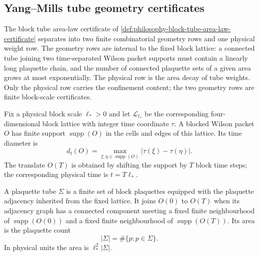 \subsection{Yang--Mills tube geometry certificates}
\label{subsec:philosophy-yang-mills-tube-geometry-certificates}

The block tube area-law certificate of
\autoref{def:philosophy-block-tube-area-law-certificate} separates into
two finite combinatorial geometry rows and one physical weight row. The
geometry rows are internal to the fixed block lattice: a connected tube
joining two time-separated Wilson packet supports must contain a
linearly long plaquette chain, and the number of connected plaquette
sets of a given area grows at most exponentially. The physical row is
the area decay of tube weights. Only the physical row carries the
confinement content; the two geometry rows are finite block-scale
certificates.

\begin{definition}
\label{def:philosophy-blocked-wilson-support}
Fix a physical block scale $\ell_{\ast}>0$ and let
$\mathcal L_{\ell_{\ast}}$ be the corresponding four-dimensional block
lattice with integer time coordinate $\tau$. A blocked Wilson packet
$O$ has finite support $\operatorname{supp}(O)$ in the cells and edges
of this lattice. Its time diameter is
$$
d_t(O)=
\max_{\xi,\eta\in\operatorname{supp}(O)}
|\tau(\xi)-\tau(\eta)|.
$$
The translate $O(T)$ is obtained by shifting the support by $T$ block
time steps; the corresponding physical time is $t=T\ell_{\ast}$.
\end{definition}

\begin{definition}
\label{def:philosophy-plaquette-tube}
A plaquette tube $\Sigma$ is a finite set of block plaquettes equipped
with the plaquette adjacency inherited from the fixed lattice. It joins
$O(0)$ to $O(T)$ when its adjacency graph has a connected component
meeting a fixed finite neighbourhood of $\operatorname{supp}(O(0))$
and a fixed finite neighbourhood of $\operatorname{supp}(O(T))$. Its
area is the plaquette count
$$
|\Sigma|=\#\{p:p\in\Sigma\}.
$$
In physical units the area is $\ell_{\ast}^{2}|\Sigma|$.
\end{definition}

